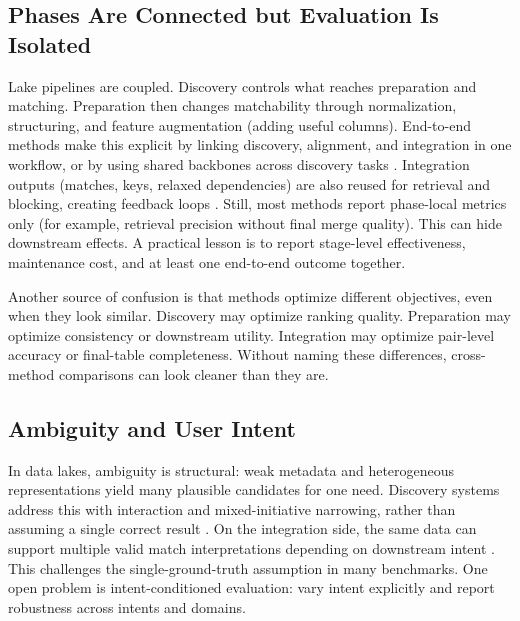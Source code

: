 \documentclass[sigconf,nonacm]{acmart}
\begin{document}
\subsection{Phases Are Connected but Evaluation Is Isolated}
Lake pipelines are coupled. Discovery controls what reaches preparation and matching. Preparation then changes matchability through normalization, structuring, and feature augmentation (adding useful columns). End-to-end methods make this explicit by linking discovery, alignment, and integration in one workflow, or by using shared backbones across discovery tasks \cite{10.1145/3555041.3589732,10.14778/3574245.3574274,10.14778/3659437.3659461,11112882}. Integration outputs (matches, keys, relaxed dependencies) are also reused for retrieval and blocking, creating feedback loops \cite{10184556,10.1145/3588929}. Still, most methods report phase-local metrics only (for example, retrieval precision without final merge quality). This can hide downstream effects. A practical lesson is to report stage-level effectiveness, maintenance cost, and at least one end-to-end outcome together.

Another source of confusion is that methods optimize different objectives, even when they look similar. Discovery may optimize ranking quality. Preparation may optimize consistency or downstream utility. Integration may optimize pair-level accuracy or final-table completeness. Without naming these differences, cross-method comparisons can look cleaner than they are.

\subsection{Ambiguity and User Intent}
In data lakes, ambiguity is structural: weak metadata and heterogeneous representations yield many plausible candidates for one need. Discovery systems address this with interaction and mixed-initiative narrowing, rather than assuming a single correct result \cite{10184768,10.14778/3685800.3685880}. On the integration side, the same data can support multiple valid match interpretations depending on downstream intent \cite{10.1145/3588722}. This challenges the single-ground-truth assumption in many benchmarks. One open problem is intent-conditioned evaluation: vary intent explicitly and report robustness across intents and domains.
\end{document}
